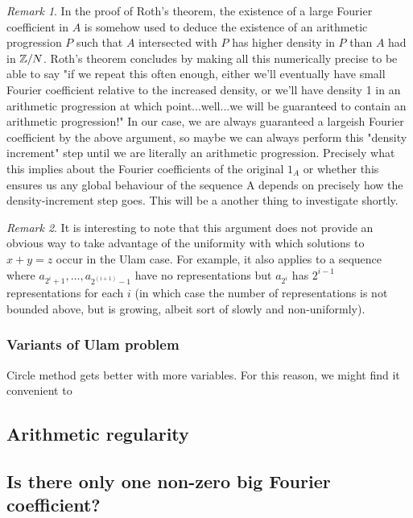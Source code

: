 \documentclass{article}
\theoremstyle{definition}
\theoremstyle{remark}
\newtheorem{remark}{Remark}
\numberwithin{equation}{section}
\begin{document}
\begin{remark}
  In the proof of Roth's theorem, the existence of a large Fourier
  coefficient in $A$ is somehow used to deduce the existence of an
  arithmetic progression $P$ such that $A$ intersected with $P$ has
  higher density in $P$ than $A$ had in $\mathbb{Z}/N$.  Roth's theorem
  concludes by making all this numerically precise to be able to say
  "if we repeat this often enough, either we'll eventually have small
  Fourier coefficient relative to the increased density, or we'll have
  density 1 in an arithmetic progression at which point...well...we
  will be guaranteed to contain an arithmetic progression!"  In our
  case, we are always guaranteed a largeish Fourier coefficient by the
  above argument, so maybe we can always perform this "density
  increment" step until we are literally an arithmetic progression.
  Precisely what this implies about the Fourier coefficients of the
  original $1_A$ or whether this ensures us any global behaviour of
  the sequence A depends on precisely how the density-increment step
  goes.  This will be a another thing to investigate shortly.
\end{remark}

\begin{remark}
  It is interesting to note that this argument does not provide an
  obvious way to take advantage of the uniformity with which solutions
  to $x+y=z$ occur in the Ulam case.  For example, it also applies to
  a sequence where $a_{2^i+1}, \ldots, a_{2^(i+1)-1}$ have no
  representations but $a_{2^i}$ has $2^{i-1}$ representations for each
  $i$ (in which case the number of representations is not bounded
  above, but is growing, albeit sort of slowly and non-uniformly).
\end{remark}

\subsubsection{Variants of Ulam problem}

Circle method gets better with more variables.  For this reason, we
might find it convenient to 

\subsection{Arithmetic regularity}


\subsection{Is there only one non-zero big Fourier coefficient?}
\end{document}
